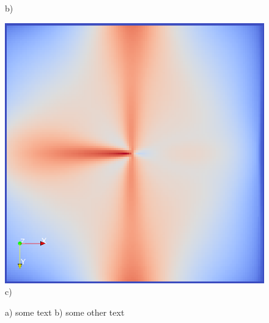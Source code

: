 \documentclass{scrartcl}
\begin{document}
\begin{figure}[!t]
\begin{minipage}{0.3\textwidth}
	b)
    \label{b)}
  \end{minipage}
  \begin{minipage}{0.3\textwidth}
  \centering
    \includegraphics[height=\textwidth]{img/inverse101.PNG}
	c)
    \label{b)}
  \end{minipage}
  \caption{ \protect a) some text 
  \protect b) some other text}
\label{res_ftle}
\end{figure}

%
%
%
\end{document}
